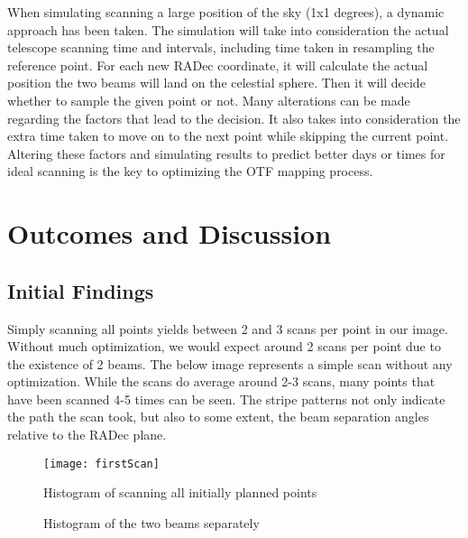 \documentclass{article}%
\begin{document}
\newpage
When simulating scanning a large position of the sky (1x1 degrees), a dynamic approach has been taken. The simulation will take into consideration the actual telescope scanning time and intervals, including time taken in resampling the reference point. For each new RADec coordinate, it will calculate the actual position the two beams will land on the celestial sphere. Then it will decide whether to sample the given point or not. Many alterations can be made regarding the factors that lead to the decision. It also takes into consideration the extra time taken to move on to the next point while skipping the current point. Altering these factors and simulating results to predict better days or times for ideal scanning is the key to optimizing the OTF mapping process.
\newpage
\section{Outcomes and Discussion}
\subsection{Initial Findings}
Simply scanning all points yields between 2 and 3 scans per point in our image. Without much optimization, we would expect around 2 scans per point due to the existence of 2 beams. The below image represents a simple scan without any optimization. While the scans do average around 2-3 scans, many points that have been scanned 4-5 times can be seen. The stripe patterns not only indicate the path the scan took, but also to some extent, the beam separation angles relative to the RADec plane.

\begin{figure}[h!]
\texttt{[image: firstScan]}
\caption{Histogram of scanning all initially planned points}
\end{figure}
\newpage

\begin{figure}
    \centering
    \qquad
    \caption{Histogram of the two beams separately}
\end{figure}
\end{document}
